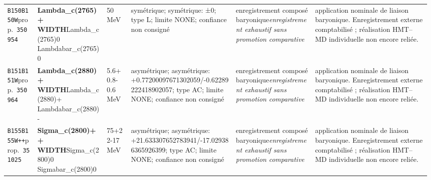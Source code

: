 \begin{landscape}
\begin{longtable}{L{1.85cm}L{4.45cm}L{2.35cm}L{4.05cm}L{3.35cm}L{7.15cm}}
\texttt{B150}\newline \texttt{B150W}\newline prop.\ \texttt{350954} & \textbf{Lambda\_\allowbreak{}c(2765)+ WIDTH}\newline Lambda\_\allowbreak{}c(2765)0 \textbar{}\allowbreak{} Lambdabar\_\allowbreak{}c(2765)0 & 50\,MeV & symétrique; symétrique: ±0; type L; limite NONE; confiance non consigné & enregistrement composé baryonique\newline \emph{enregistrement exhaustif sans promotion comparative} & application nominale de liaison baryonique. Enregistrement externe comptabilisé ; réalisation HMT--MD individuelle non encore reliée. \\
\texttt{B151}\newline \texttt{B151W}\newline prop.\ \texttt{350964} & \textbf{Lambda\_\allowbreak{}c(2880)+ WIDTH}\newline Lambda\_\allowbreak{}c(2880)+ \textbar{}\allowbreak{} Lambdabar\_\allowbreak{}c(2880)- & 5.6+0.8-0.6\,MeV & asymétrique; asymétrique: +0.77200097671302059/-0.62289222418902057; type AC; limite NONE; confiance non consigné & enregistrement composé baryonique\newline \emph{enregistrement exhaustif sans promotion comparative} & application nominale de liaison baryonique. Enregistrement externe comptabilisé ; réalisation HMT--MD individuelle non encore reliée. \\
\texttt{B155}\newline \texttt{B155W++}\newline prop.\ \texttt{351025} & \textbf{Sigma\_\allowbreak{}c(2800)++ WIDTH}\newline Sigma\_\allowbreak{}c(2800)0 \textbar{}\allowbreak{} Sigmabar\_\allowbreak{}c(2800)0 & 75+22-17\,MeV & asymétrique; asymétrique: +21.633307652783941/-17.029386365926399; type AC; limite NONE; confiance non consigné & enregistrement composé baryonique\newline \emph{enregistrement exhaustif sans promotion comparative} & application nominale de liaison baryonique. Enregistrement externe comptabilisé ; réalisation HMT--MD individuelle non encore reliée. \\

\end{longtable}
\end{landscape}
